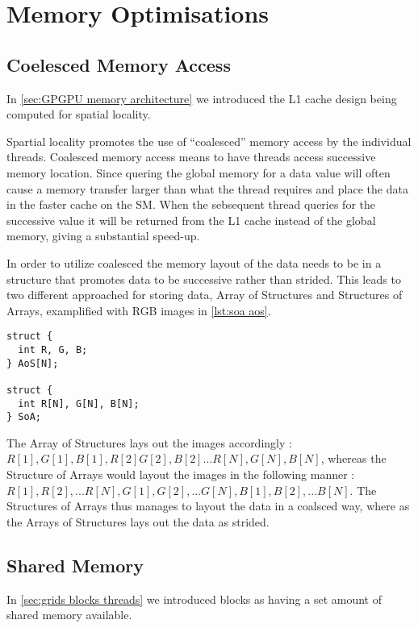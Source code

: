 \section{Memory Optimisations}
\label{sec:memory optimisations}
\subsection{Coelesced Memory Access}
\label{sec:coalesced}

In \cref{sec:GPGPU memory architecture} we introduced the L1 cache design being computed for spatial locality.

Spartial locality promotes the use of ``coalesced'' memory access by the individual threads.
Coalesced memory access means to have threads access successive memory location.
Since quering the global memory for a data value will often cause a memory transfer larger than what the thread requires and place the data in the faster cache on the SM.
When the sebsequent thread queries for the successive value it will be returned from the L1 cache instead of the global memory, giving a substantial speed-up.

In order to utilize coalesced the memory layout of the data needs to be in a structure that promotes data to be successive rather than strided.\cite{udacity}
This leads to two different approached for storing data, Array of Structures and Structures of Arrays, examplified with RGB images in \cref{lst:soa aos}.

\begin{lstlisting}[caption={Example of SoA and AoS with RGB images}, label={lst:soa aos}]
struct {
  int R, G, B;
} AoS[N];

struct {
  int R[N], G[N], B[N];
} SoA;
\end{lstlisting}

The Array of Structures lays out the images accordingly : $R[1], G[1], B[1], R[2] G[2], B[2] ... R[N], G[N], B[N]$, whereas the Structure of Arrays would layout the images in the following manner : $R[1], R[2], ... R[N], G[1], G[2], ... G[N], B[1], B[2], ... B[N]$.
The Structures of Arrays thus manages to layout the data in a coalsced way, where as the Arrays of Structures lays out the data as strided.

\subsection{Shared Memory}
In \cref{sec:grids blocks threads} we introduced blocks as having a set amount of shared memory available.

